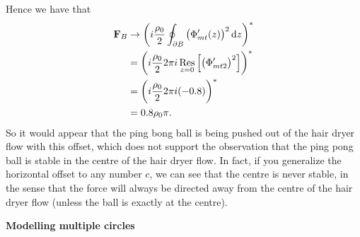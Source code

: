\documentclass{article}
\DeclareMathOperator*{\res}{Res}
\def\*#1{\mathbf{#1}}
\begin{document}
%
Hence we have that
%
\begin{align*}
    \*F_B
        &\to \del{i \frac{\rho_0}{2} \oint_{\partial B} \del{\Phi_{mt}^\prime(z)}^2 \dif z}^* \\
        &= \del{i \frac{\rho_0}{2} 2 \pi i \res_{z = 0} \sbr{\del{\Phi^\prime_{mt2}}^2}}^* \\
        &= \del{i \frac{\rho_0}{2} 2 \pi i (-0.8)}^* \\
        &= 0.8 \rho_0 \pi
    .
\end{align*}
%
So it would appear that the ping bong ball is being pushed out of the
hair dryer flow with this offset, which does not support the observation
that the ping pong ball is stable in the centre of the hair dryer flow.
In fact, if you generalize the horizontal offset to any number $c$, we
can see that the centre is never stable, in the sense that the force
will always be directed away from the centre of the hair dryer flow
(unless the ball is exactly at the centre).

\textbf{Modelling multiple circles}
\end{document}
